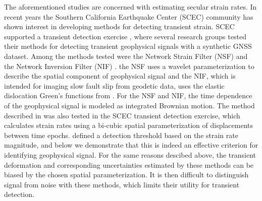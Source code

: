 \documentclass[10pt,letter]{article}
\begin{document}
The aforementioned studies are concerned with estimating secular strain rates. In recent years the Southern California Earthquake Center (SCEC) community has shown interest in developing methods for detecting transient strain. SCEC supported a transient detection exercise \citep{Lohman2013}, where several research groups tested their methods for detecting transient geophysical signals with a synthetic GNSS dataset. Among the methods tested were the Network Strain Filter (NSF) \citep{Ohtani2010} and the Network Inversion Filter (NIF) \citep{Segall1997}. the NSF uses a wavelet parameterization to  describe the spatial component of geophysical signal and the NIF, which is intended for imaging slow fault slip from geodetic data, uses the elastic dislocation Green's functions from \citet{Okada1992}. For the NSF and NIF, the time dependence of the geophysical signal is modeled as integrated Brownian motion. The method described in \citet{Holt2013} was also tested in the SCEC transient detection exercise, which calculates strain rates using a bi-cubic spatial parameterization of displacements between time epochs. \citet{Holt2013} defined a detection threshold based on the strain rate magnitude, and below we demonstrate that this is indeed an effective criterion for identifying geophysical signal. For the same reasons descibed above, the transient deformation and corresponding uncertainties estimated by these methods can be biased by the chosen spatial parameterization. It is then difficult to distinguish signal from noise with these methods, which limits their utility for transient detection.   
\end{document}
